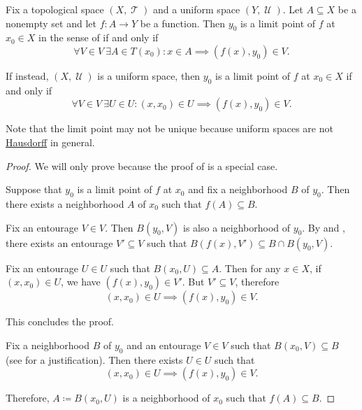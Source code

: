 \begin{proposition}\label{thm:uniform_space_local_convergence}
  Fix a topological space \( (X, \mscrT) \) and a uniform space \( (Y, \mscrU) \). Let \( A \subseteq X \) be a nonempty set and let \( f: A \to Y \) be a function. Then \( y_0 \) is a limit point of \( f \) at \( x_0 \in X \) in the sense of  if and only if
  \begin{equation}\label{thm:uniform_space_local_convergence/topological_source}
    \forall V \in V \ \exists A \in T(x_0) : x \in A \implies (f(x), y_0) \in V.
  \end{equation}

  If instead, \( (X, \mscrU) \) is a uniform space, then \( y_0 \) is a limit point of \( f \) at \( x_0 \in X \) if and only if
  \begin{equation}\label{thm:uniform_space_local_convergence/uniform_source}
    \forall V \in V \ \exists U \in U : (x, x_0) \in U \implies (f(x), y_0) \in V.
  \end{equation}

  Note that the limit point may not be unique because uniform spaces are not \hyperref[def:separation_axioms/T2]{Hausdorff} in general.
\end{proposition}
\begin{proof}
  We will only prove  because the proof of  is a special case.

  \SufficiencySubProof Suppose that \( y_0 \) is a limit point of \( f \) at \( x_0 \) and fix a neighborhood \( B \) of \( y_0 \). Then there exists a neighborhood \( A \) of \( x_0 \) such that \( f(A) \subseteq B \).

  Fix an entourage \( V \in V \). Then \( B(y_0, V) \) is also a neighborhood of \( y_0 \). By  and , there exists an entourage \( V' \subseteq V \) such that \( B(f(x), V') \subseteq B \cap B(y_0, V) \).

  Fix an entourage \( U \in U \) such that \( B(x_0, U) \subseteq A \). Then for any \( x \in X \), if \( (x, x_0) \in U \), we have \( (f(x), y_0) \in V' \). But \( V' \subseteq V \), therefore
  \begin{equation*}
    (x, x_0) \in U \implies (f(x), y_0) \in V.
  \end{equation*}

  This concludes the proof.

  \NecessitySubProof Fix a neighborhood \( B \) of \( y_0 \) and an entourage \( V \in V \) such that \( B(x_0, V) \subseteq B \) (see  for a justification). Then there exists \( U \in U \) such that
  \begin{equation*}
    (x, x_0) \in U \implies (f(x), y_0) \in V.
  \end{equation*}

  Therefore, \( A \coloneqq B(x_0, U) \) is a neighborhood of \( x_0 \) such that \( f(A) \subseteq B \).
\end{proof}


